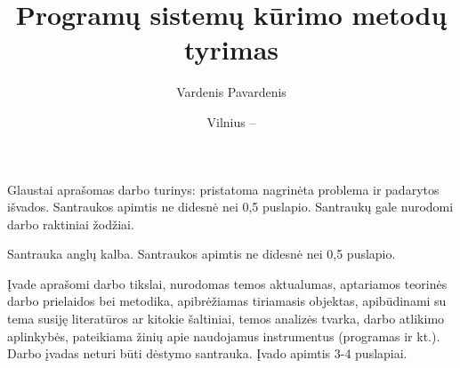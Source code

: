 \documentclass{VUMIFPSmagistrinis}
\title{Programų sistemų kūrimo metodų tyrimas}
\author{Vardenis Pavardenis}
\date{Vilnius – \the\year}
\begin{document}
\maketitle


Glaustai aprašomas darbo turinys: pristatoma nagrinėta problema ir padarytos
išvados. Santraukos apimtis ne didesnė nei 0,5 puslapio. Santraukų gale
nurodomi darbo raktiniai žodžiai.

Santrauka anglų kalba. Santraukos apimtis ne didesnė nei 0,5 puslapio.

\tableofcontents

Įvade aprašomi darbo tikslai, nurodomas temos aktualumas, aptariamos teorinės
darbo prielaidos bei metodika, apibrėžiamas tiriamasis objektas,
apibūdinami su tema susiję literatūros ar kitokie šaltiniai, temos analizės
tvarka, darbo atlikimo aplinkybės, pateikiama žinių apie naudojamus
instrumentus (programas ir kt.). Darbo įvadas neturi būti dėstymo santrauka.
Įvado apimtis 3-4 puslapiai.
\end{document}
